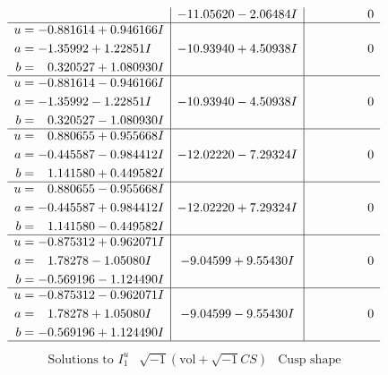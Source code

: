 \documentclass[1p]{elsarticle_modified}
\theoremstyle{definition}
\newcommand{\I}{\sqrt{-1}}
\begin{document}
$$\begin{array}{c|c|c}
 & -11.05620 - 2.06484 I & \phantom{-0.000000 } 0 \\ \hline\begin{aligned}
u &= -0.881614 + 0.946166 I \\
a &= -1.35992 + 1.22851 I \\
b &= \phantom{-}0.320527 + 1.080930 I\end{aligned}
 & -10.93940 + 4.50938 I & \phantom{-0.000000 } 0 \\ \hline\begin{aligned}
u &= -0.881614 - 0.946166 I \\
a &= -1.35992 - 1.22851 I \\
b &= \phantom{-}0.320527 - 1.080930 I\end{aligned}
 & -10.93940 - 4.50938 I & \phantom{-0.000000 } 0 \\ \hline\begin{aligned}
u &= \phantom{-}0.880655 + 0.955668 I \\
a &= -0.445587 - 0.984412 I \\
b &= \phantom{-}1.141580 + 0.449582 I\end{aligned}
 & -12.02220 - 7.29324 I & \phantom{-0.000000 } 0 \\ \hline\begin{aligned}
u &= \phantom{-}0.880655 - 0.955668 I \\
a &= -0.445587 + 0.984412 I \\
b &= \phantom{-}1.141580 - 0.449582 I\end{aligned}
 & -12.02220 + 7.29324 I & \phantom{-0.000000 } 0 \\ \hline\begin{aligned}
u &= -0.875312 + 0.962071 I \\
a &= \phantom{-}1.78278 - 1.05080 I \\
b &= -0.569196 - 1.124490 I\end{aligned}
 & -9.04599 + 9.55430 I & \phantom{-0.000000 } 0 \\ \hline\begin{aligned}
u &= -0.875312 - 0.962071 I \\
a &= \phantom{-}1.78278 + 1.05080 I \\
b &= -0.569196 + 1.124490 I\end{aligned}
 & -9.04599 - 9.55430 I & \phantom{-0.000000 } 0\\
 \hline 
 \end{array}$$\newpage$$\begin{array}{c|c|c}  
\text{Solutions to }I^u_{1}& \I (\text{vol} + \sqrt{-1}CS) & \text{Cusp shape}\\

\end{array}$$
\end{document}
